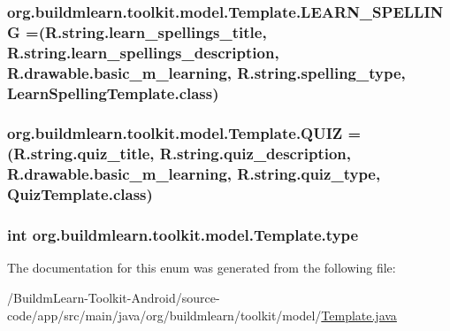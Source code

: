 \hypertarget{enumorg_1_1buildmlearn_1_1toolkit_1_1model_1_1Template_ac92d5f18de318d36ba42ae0aba85576d}{
\subsubsection[{L\-E\-A\-R\-N\-\_\-\-S\-P\-E\-L\-L\-I\-N\-G}]{\setlength{\rightskip}{0pt plus 5cm}org.\-buildmlearn.\-toolkit.\-model.\-Template.\-L\-E\-A\-R\-N\-\_\-\-S\-P\-E\-L\-L\-I\-N\-G =(R.\-string.\-learn\-\_\-spellings\-\_\-title, R.\-string.\-learn\-\_\-spellings\-\_\-description, R.\-drawable.\-basic\-\_\-m\-\_\-learning, R.\-string.\-spelling\-\_\-type, Learn\-Spelling\-Template.\-class)}}\label{enumorg_1_1buildmlearn_1_1toolkit_1_1model_1_1Template_ac92d5f18de318d36ba42ae0aba85576d}
\hypertarget{enumorg_1_1buildmlearn_1_1toolkit_1_1model_1_1Template_aee37e120e37544ed8fff5341f9012fee}{
\subsubsection[{Q\-U\-I\-Z}]{\setlength{\rightskip}{0pt plus 5cm}org.\-buildmlearn.\-toolkit.\-model.\-Template.\-Q\-U\-I\-Z =(R.\-string.\-quiz\-\_\-title, R.\-string.\-quiz\-\_\-description, R.\-drawable.\-basic\-\_\-m\-\_\-learning, R.\-string.\-quiz\-\_\-type, Quiz\-Template.\-class)}}\label{enumorg_1_1buildmlearn_1_1toolkit_1_1model_1_1Template_aee37e120e37544ed8fff5341f9012fee}
\hypertarget{enumorg_1_1buildmlearn_1_1toolkit_1_1model_1_1Template_a92b84675089efb1f591b3342793df5c4}{
\subsubsection[{type}]{\setlength{\rightskip}{0pt plus 5cm}int org.\-buildmlearn.\-toolkit.\-model.\-Template.\-type}}\label{enumorg_1_1buildmlearn_1_1toolkit_1_1model_1_1Template_a92b84675089efb1f591b3342793df5c4}


The documentation for this enum was generated from the following file\-:\begin{DoxyCompactItemize}
\item 
/\-Buildm\-Learn-\/\-Toolkit-\/\-Android/source-\/code/app/src/main/java/org/buildmlearn/toolkit/model/\hyperlink{Template_8java}{Template.\-java}\end{DoxyCompactItemize}
